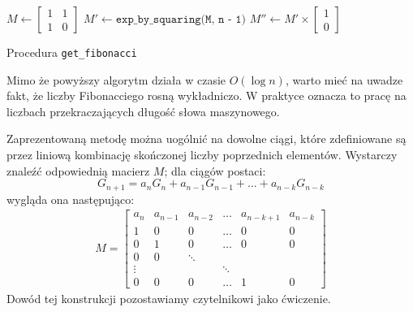 \begin{algorithm}[h]
  \DontPrintSemicolon



  $M \leftarrow \begin{bmatrix}
                  1 & 1 \\
                  1 & 0
                \end{bmatrix}$\;
  $M' \leftarrow \texttt{exp\_by\_squaring(M, n - 1)}$\;
  $M'' \leftarrow M' \times \begin{bmatrix}1 \\ 0\end{bmatrix}$\;
  \;

  \caption{Procedura \texttt{get\_fibonacci}}
\end{algorithm}
Mimo że powyższy algorytm działa w czasie $O(\log{n})$, warto mieć na uwadze fakt, że liczby Fibonacciego 
rosną wykładniczo. W praktyce oznacza to pracę na liczbach przekraczających długość słowa maszynowego.

Zaprezentowaną metodę można uogólnić na dowolne ciągi, które zdefiniowane są przez liniową 
kombinację skończonej liczby poprzednich elementów. Wystarczy znaleźć odpowiednią macierz $M$; 
dla ciągów postaci:
\begin{equation*}
  G_{n + 1} = a_n G_n + a_{n - 1} G_{n - 1} + ... + a_{n - k} G_{n - k}
\end{equation*}
wygląda ona następująco:
\begin{align*}
  M
  =
  \begin{bmatrix}
    a_n    & a_{n - 1} & a_{n - 2} & \dots & a_{n - k + 1} & a_{n - k} \\
    1      & 0         & 0         & \dots & 0             & 0 \\
    0      & 1         & 0         & \dots & 0             & 0 \\
    0      & 0         & \ddots \\
    \vdots &           &           & \ddots \\
    0      & 0         & 0         & \dots & 1             & 0
  \end{bmatrix}
\end{align*}
Dowód tej konstrukcji pozostawiamy czytelnikowi jako ćwiczenie.
